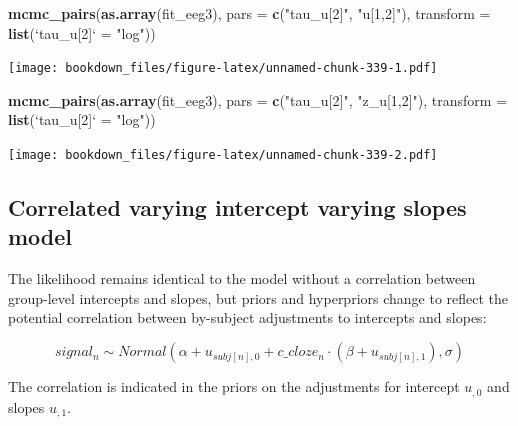 \documentclass[12pt,]{krantz}
\newenvironment{Shaded}{\begin{snugshade}}{\end{snugshade}}
\newcommand{\KeywordTok}[1]{\textcolor[rgb]{0.13,0.29,0.53}{\textbf{#1}}}
\newcommand{\DataTypeTok}[1]{\textcolor[rgb]{0.13,0.29,0.53}{#1}}
\newcommand{\StringTok}[1]{\textcolor[rgb]{0.31,0.60,0.02}{#1}}
\newcommand{\NormalTok}[1]{#1}
\theoremstyle{definition}
\theoremstyle{definition}
\theoremstyle{definition}
\theoremstyle{remark}
\begin{document}
\begin{Shaded}
\begin{Highlighting}[]
\KeywordTok{mcmc_pairs}\NormalTok{(}\KeywordTok{as.array}\NormalTok{(fit_eeg3), }\DataTypeTok{pars =} \KeywordTok{c}\NormalTok{(}\StringTok{"tau_u[2]"}\NormalTok{, }\StringTok{"u[1,2]"}\NormalTok{),}
           \DataTypeTok{transform =} \KeywordTok{list}\NormalTok{(}\StringTok{`}\DataTypeTok{tau_u[2]}\StringTok{`}\NormalTok{ =}\StringTok{ "log"}\NormalTok{))}
\end{Highlighting}
\end{Shaded}

\texttt{[image: bookdown\_files/figure-latex/unnamed-chunk-339-1.pdf]}

\begin{Shaded}
\begin{Highlighting}[]
\KeywordTok{mcmc_pairs}\NormalTok{(}\KeywordTok{as.array}\NormalTok{(fit_eeg3), }\DataTypeTok{pars =} \KeywordTok{c}\NormalTok{(}\StringTok{"tau_u[2]"}\NormalTok{, }\StringTok{"z_u[1,2]"}\NormalTok{),}
           \DataTypeTok{transform =} \KeywordTok{list}\NormalTok{(}\StringTok{`}\DataTypeTok{tau_u[2]}\StringTok{`}\NormalTok{ =}\StringTok{ "log"}\NormalTok{))}
\end{Highlighting}
\end{Shaded}

\texttt{[image: bookdown\_files/figure-latex/unnamed-chunk-339-2.pdf]}

\subsection{Correlated varying intercept varying slopes
model}\label{sec:corrstan}

The likelihood remains identical to the model without a correlation
between group-level intercepts and slopes, but priors and hyperpriors
change to reflect the potential correlation between by-subject
adjustments to intercepts and slopes:

\begin{equation}
  signal_n \sim Normal(\alpha + u_{subj[n],0} + c\_cloze_n \cdot  (\beta + u_{subj[n],1}),\sigma)
\end{equation}

The correlation is indicated in the priors on the adjustments for
intercept \(u_{,0}\) and slopes \(u_{,1}\).
\end{document}
